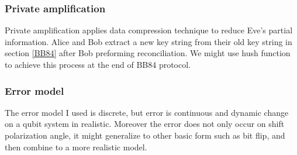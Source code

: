 \documentclass[12pt]{article}
\begin{document}
\subsubsection{Private amplification}
Private amplification applies data compression technique to reduce Eve's partial information. Alice and Bob extract a new key string from their old key string in section \ref{BB84} after Bob preforming reconciliation. We might use hush function to achieve this process \cite[p.88]{van2006quantum} at the end of BB84 protocol. 
\subsubsection{Error model}
The error model I used is discrete, but error is continuous and dynamic change on a qubit system in realistic. Moreover the error does not only occur on shift polarization angle, it might generalize to other basic form such as bit flip, and then combine to a more realistic model.
\appendix
%




\end{document}
